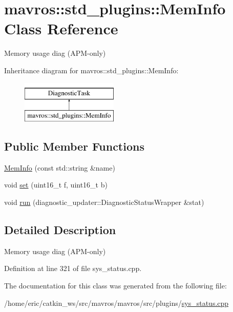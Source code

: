 \hypertarget{classmavros_1_1std__plugins_1_1MemInfo}{}\section{mavros\+::std\+\_\+plugins\+::Mem\+Info Class Reference}
\label{classmavros_1_1std__plugins_1_1MemInfo}


Memory usage diag (A\+P\+M-\/only)  


Inheritance diagram for mavros\+::std\+\_\+plugins\+::Mem\+Info\+:\begin{figure}[H]
\begin{center}
\leavevmode
\includegraphics[height=2.000000cm]{classmavros_1_1std__plugins_1_1MemInfo}
\end{center}
\end{figure}
\subsection*{Public Member Functions}
\begin{DoxyCompactItemize}
\item 
\mbox{\hyperlink{group__plugin_gad4fb422808df0eb7e17e9ec98f16a95d}{Mem\+Info}} (const std\+::string \&name)
\item 
void \mbox{\hyperlink{group__plugin_ga43594790e090ecc310c3dce79003bba5}{set}} (uint16\+\_\+t f, uint16\+\_\+t b)
\item 
void \mbox{\hyperlink{group__plugin_gaa1dfbb09b0fa4ddd991b8e4ec012767c}{run}} (diagnostic\+\_\+updater\+::\+Diagnostic\+Status\+Wrapper \&stat)
\end{DoxyCompactItemize}


\subsection{Detailed Description}
Memory usage diag (A\+P\+M-\/only) 

Definition at line 321 of file sys\+\_\+status.\+cpp.



The documentation for this class was generated from the following file\+:\begin{DoxyCompactItemize}
\item 
/home/eric/catkin\+\_\+ws/src/mavros/mavros/src/plugins/\mbox{\hyperlink{sys__status_8cpp}{sys\+\_\+status.\+cpp}}\end{DoxyCompactItemize}

